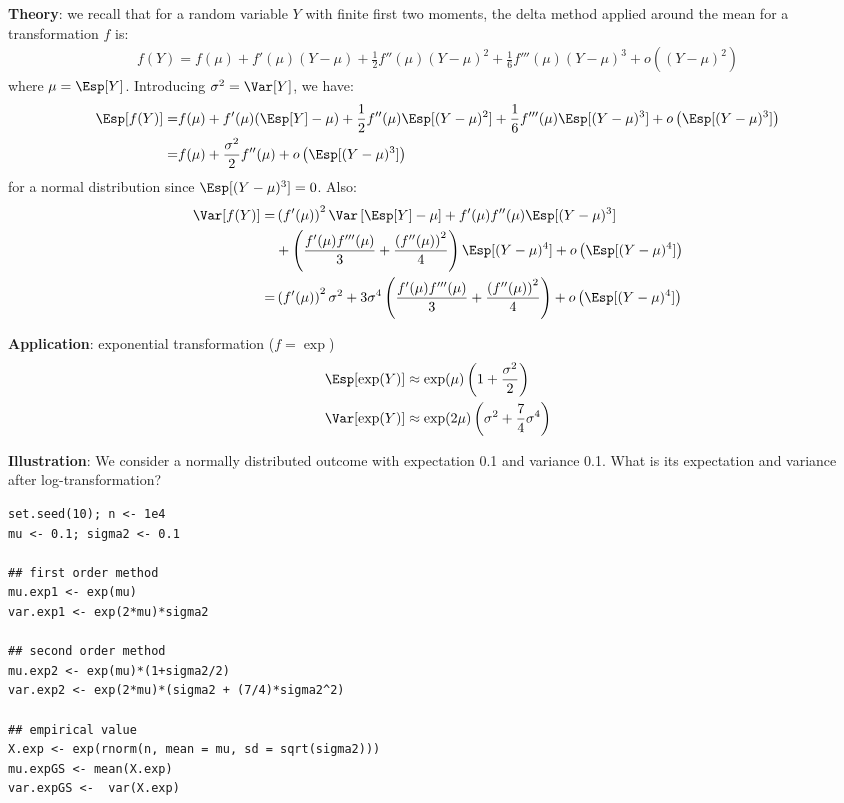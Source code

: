 \documentclass[12pt]{article}
\begin{document}
\textbf{Theory}: we recall that for a random variable \(Y\) with finite first two
moments, the delta method applied around the mean for a transformation
\(f\) is:
\begin{align*}
f(Y) = f(\mu) + f'(\mu) (Y-\mu) + \frac{1}{2} f''(\mu) (Y-\mu)^2  + \frac{1}{6} f'''(\mu) (Y-\mu)^3 + o\left((Y-\mu)^2\right)
\end{align*}
where \(\mu=\Esp[Y]\). Introducing \(\sigma^2 = \Var[Y]\), we have:
\begin{align*}
\Esp[f(Y)] =& f(\mu) + f'(\mu) (\Esp[Y]-\mu) + \frac{1}{2} f''(\mu) \Esp[(Y-\mu)^2] + \frac{1}{6} f'''(\mu) \Esp[(Y-\mu)^3] + o\left(\Esp[(Y-\mu)^3]\right) \\
=& f(\mu) + \frac{\sigma^2}{2} f''(\mu)  + o\left(\Esp[(Y-\mu)^3]\right)
\end{align*}
for a normal distribution since \(\Esp[(Y-\mu)^3]=0\). Also:
\begin{align*}
\Var[f(Y)] =& \left(f'(\mu)\right)^2 \Var\left[\Esp[Y]-\mu\right] + f'(\mu)f''(\mu) \Esp[(Y-\mu)^3] \\
& +\left(\frac{f'(\mu) f'''(\mu)}{3} + \frac{\left(f''(\mu)\right)^2}{4}\right) \Esp[(Y-\mu)^4] + o\left(\Esp[(Y-\mu)^4]\right) \\
=& \left(f'(\mu)\right)^2 \sigma^2 + 3 \sigma^4 \left(\frac{f'(\mu) f'''(\mu)}{3} + \frac{\left(f''(\mu)\right)^2}{4}\right) + o\left(\Esp[(Y-\mu)^4]\right) \\
\end{align*}

\bigskip

\textbf{Application}:  exponential transformation (\(f = \exp\))
\begin{align*}
\Esp[\exp(Y)] &\approx \exp(\mu)\left(1 + \frac{\sigma^2}{2}\right) \\
\Var[\exp(Y)] &\approx \exp(2\mu)\left(\sigma^2 + \frac{7}{4} \sigma^4\right) \\
\end{align*}

\clearpage

\textbf{Illustration}: We consider a normally distributed outcome with
expectation 0.1 and variance 0.1. What is its expectation and variance
after log-transformation?
\lstset{language=r,label= ,caption= ,captionpos=b,numbers=none}
\begin{lstlisting}
set.seed(10); n <- 1e4
mu <- 0.1; sigma2 <- 0.1

## first order method
mu.exp1 <- exp(mu)
var.exp1 <- exp(2*mu)*sigma2

## second order method
mu.exp2 <- exp(mu)*(1+sigma2/2)
var.exp2 <- exp(2*mu)*(sigma2 + (7/4)*sigma2^2)

## empirical value
X.exp <- exp(rnorm(n, mean = mu, sd = sqrt(sigma2)))
mu.expGS <- mean(X.exp)
var.expGS <-  var(X.exp)
\end{lstlisting}
\end{document}
